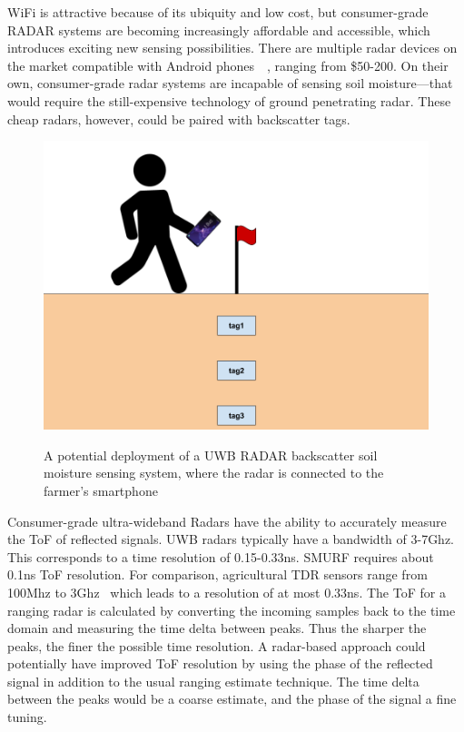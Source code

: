 \documentclass[12pt]{article}
\begin{document}
WiFi is attractive because of its ubiquity and low cost, but
consumer-grade RADAR systems are becoming increasingly affordable and
accessible, which introduces exciting new sensing possibilities. There
are multiple radar devices on the market compatible with Android
phones~\cite{walabot}~\cite{omnipresense}, ranging from \$50-200. On their own,
consumer-grade radar systems are incapable of sensing soil
moisture---that would require the still-expensive technology of ground
penetrating radar. These cheap radars, however, could be paired with
backscatter tags.

\begin{figure}[h!]
  \centering
  \includegraphics[scale=0.4]{soil_moisture_diagram.png}\\
  \caption{A potential deployment of a UWB RADAR backscatter soil
    moisture sensing system, where the radar is connected to the
    farmer's smartphone}
\end{figure}

Consumer-grade ultra-wideband Radars have the ability to accurately
measure the ToF of reflected signals. UWB radars typically have a
bandwidth of 3-7Ghz. This corresponds to a time resolution of
0.15-0.33ns. SMURF requires about 0.1ns ToF resolution. For
comparison, agricultural TDR sensors range from 100Mhz to
3Ghz~\cite{Pelletier2012} which leads to a resolution of at most
0.33ns. The ToF for a ranging radar is calculated by converting the
incoming samples back to the time domain and measuring the time delta
between peaks. Thus the sharper the peaks, the finer the possible
time resolution. A radar-based approach could potentially have
improved ToF resolution by using the phase of the reflected signal in
addition to the usual ranging estimate technique. The time delta
between the peaks would be a coarse estimate, and the phase of the
signal a fine tuning.
\end{document}
